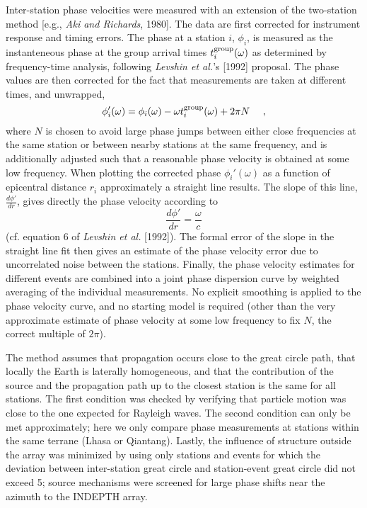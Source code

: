 \documentclass[12pt]{article}
\begin{document}
Inter-station phase velocities were measured with an extension of the two-station method [e.g., {\it Aki 
and Richards}, 1980]. The data are first corrected for instrument response and timing errors. The phase at 
a station $i$, $\phi_i$, is measured as the instanteneous phase at the group arrival times $t^{\rm 
group}_i(\omega)$ as determined by frequency-time analysis, following {\it Levshin et al.}'s [1992] 
proposal.  The phase values are then corrected for the fact that measurements are taken at different times, 
and unwrapped,
 \begin{displaymath} 
\phi_i'(\omega)=\phi_i(\omega)-\omega t^{\rm group}_i(\omega)+2\pi N \ \ \ \ ,
\end{displaymath} 
where $N$ is chosen to avoid large phase jumps between either close frequencies at 
the same station or between nearby stations at the same frequency, and
is additionally adjusted such that a
reasonable phase velocity is obtained at some low frequency.  When plotting the corrected phase 
$\phi_i'(\omega)$ as a function of epicentral distance $r_i$ approximately a straight line results.  The 
slope of this line, $\frac{d\phi'}{dr}$, gives directly the phase velocity according to \begin{displaymath} 
\frac{d\phi'}{dr}=\frac{\omega}{c} \end{displaymath} (cf. equation 6 of {\it Levshin et al.} [1992]). The 
formal error of the slope in the straight line fit then gives an estimate of the phase velocity error due 
to uncorrelated noise between the stations.  Finally, the phase velocity estimates for different events are 
combined into a joint phase dispersion curve by weighted averaging of the individual measurements.  No 
explicit smoothing is applied to the phase velocity curve, and no starting model is required (other than 
the very approximate estimate of phase velocity at some low frequency to fix $N$, the correct multiple of 
$2\pi$). 

The method assumes that propagation occurs close to the great circle path, that locally the Earth is 
laterally homogeneous, and that the contribution of the source and the propagation path up to the closest 
station is the same for all stations.  The first condition was checked by verifying that particle motion 
was close to the one expected for Rayleigh waves.  The second condition can only be met approximately; here 
we only compare phase measurements at stations within the same terrane (Lhasa or Qiantang).  Lastly, the 
influence of structure outside the array was minimized by using only stations and events for which the 
deviation between inter-station great circle and station-event great circle did not exceed 5\dg; source 
mechanisms were screened for large phase shifts near the azimuth to the INDEPTH array. 
\end{document}
